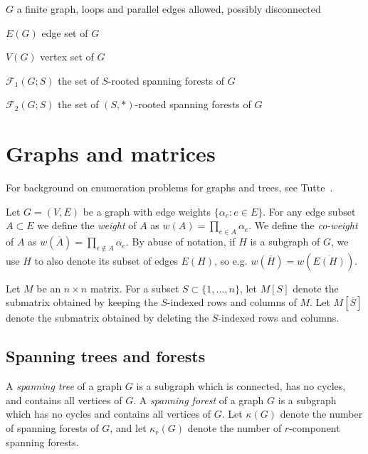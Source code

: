 \documentclass{amsart}
\theoremstyle{definition}
\newcommand{\RR}{\mathbb{R}}
\newcommand{\trees}{\mathcal{F}_1}
\newcommand{\forests}{\mathcal{F}}
\newcommand{\coweight}[1]{w(\overline{#1})}
\newcommand{\note}[1]{{\color{red} \sf $\diamondsuit$  {#1} $\diamondsuit$ }}
\begin{document}

$G$ a finite graph, 
loops and parallel edges allowed,
possibly disconnected

$E(G)$ edge set of $G$

$V(G)$ vertex set of $G$




%

$\trees(G;S)$ the set of $S$-rooted spanning forests of $G$

$\forests_2(G;S)$ the set of $(S,*)$-rooted spanning forests of $G$


\section{Graphs and matrices}
\label{sec:graphs-matrices}

For background on enumeration problems for graphs and trees, 
see 
Tutte~\cite[Chapter VI]{tutte}. 

Let $G = (V, E)$ be a graph with edge weights $\{ \alpha_e : e \in E\}$.
For any edge subset $A \subset E$ we define the {\em weight} of $A$ as
$\displaystyle
	w(A) = \prod_{e \in A} \alpha_e.
$
We define the {\em co-weight} of $A$ as
$\displaystyle
	w(\overline A) = \prod_{e \not\in A} \alpha_e.
$
By abuse of notation, if $H$ is a subgraph of $G$, we use $H$ to also denote its subset of edges $E(H)$, so e.g. $\coweight{H} = \coweight{E(H)}$.

Let $M$ be an $n \times n$ matrix.
For a subset $S \subset \{1, \ldots, n\}$, 
let $M[S]$ denote the submatrix obtained by keeping the $S$-indexed rows and columns of $M$.
Let $M[\overline{S}]$ denote the submatrix obtained by deleting the $S$-indexed rows and columns.

\subsection{Spanning trees and forests}
A {\em spanning tree} of a graph $G$ is a subgraph which 
is connected, has no cycles,
and contains all vertices of $G$.
A {\em spanning forest} of a graph $G$ is a subgraph which 
has no cycles
and 
contains all vertices of $G$. 
Let $\kappa(G)$ denote the number of spanning forests of $G$, and let $\kappa_r(G)$ denote the number of $r$-component spanning forests.
\end{document}
